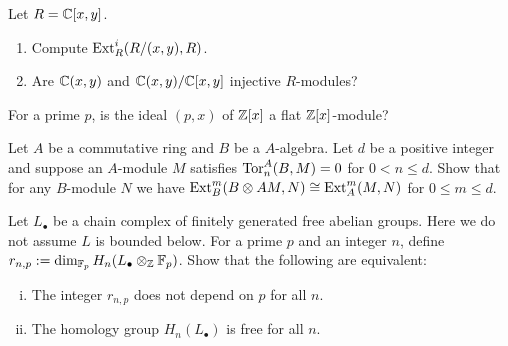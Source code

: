 \documentclass{../../../small}
\begin{document}
\begin{prb}
Let $R=\mathbb{C}[x,y]$.
\begin{enumerate}[(1)]
\item Compute $\operatorname{Ext}_R^i(R/(x,y),R)$.
\item Are $\mathbb{C}(x,y)$ and $\mathbb{C}(x,y)/\mathbb{C}[x,y]$ injective $R$-modules?
\end{enumerate}
\end{prb}
\begin{sol}
\end{sol}

\begin{prb}
For a prime $p$, is the ideal $(p,x)$ of $\mathbb{Z}[x]$ a flat $\mathbb{Z}[x]$-module?
\end{prb}
\begin{sol}
\end{sol}

\begin{prb}
Let $A$ be a commutative ring and $B$ be a $A$-algebra.
Let $d$ be a positive integer and suppose an $A$-module $M$ satisfies $\operatorname{Tor}^A_n(B,M)=0$ for $0<n\le d$.
Show that for any $B$-module $N$ we have $\operatorname{Ext}_B^m(B\otimes AM,N)\cong\operatorname{Ext}_A^m(M,N)$ for $0\le m\le d$.
\end{prb}
\begin{sol}
\end{sol}

\begin{prb}
Let $L_\bullet$ be a chain complex of finitely generated free abelian groups.
Here we do not assume $L$ is bounded below.
For a prime $p$ and an integer $n$, define $r_{n,p}:=\dim_{\mathbb{F}_p}H_n(L_\bullet\otimes_{\mathbb{Z}}\mathbb{F}_p)$.
Show that the following are equivalent:
\begin{enumerate}[(i)]
\item The integer $r_{n,p}$ does not depend on $p$ for all $n$.
\item The homology group $H_n(L_\bullet)$ is free for all $n$.
\end{enumerate}
\end{prb}
\begin{sol}
\end{sol}
\end{document}
